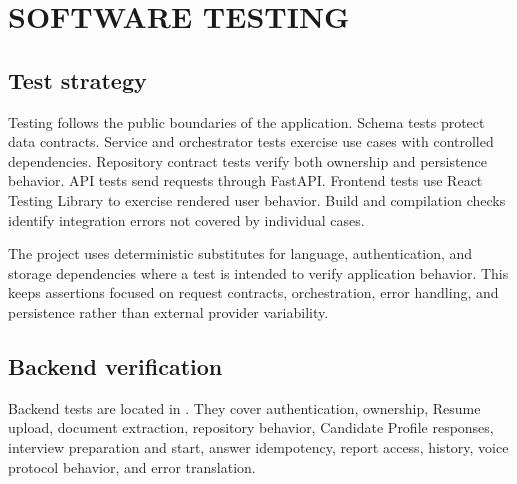 \chapter{SOFTWARE TESTING}\label{ch:testing}

\section{Test strategy}

Testing follows the public boundaries of the application. Schema tests protect data contracts. Service and orchestrator tests exercise use cases with controlled dependencies. Repository contract tests verify both ownership and persistence behavior. API tests send requests through FastAPI. Frontend tests use React Testing Library to exercise rendered user behavior. Build and compilation checks identify integration errors not covered by individual cases.


The project uses deterministic substitutes for language, authentication, and storage dependencies where a test is intended to verify application behavior. This keeps assertions focused on request contracts, orchestration, error handling, and persistence rather than external provider variability.

\section{Backend verification}

Backend tests are located in . They cover authentication, ownership, Resume upload, document extraction, repository behavior, Candidate Profile responses, interview preparation and start, answer idempotency, report access, history, voice protocol behavior, and error translation.


